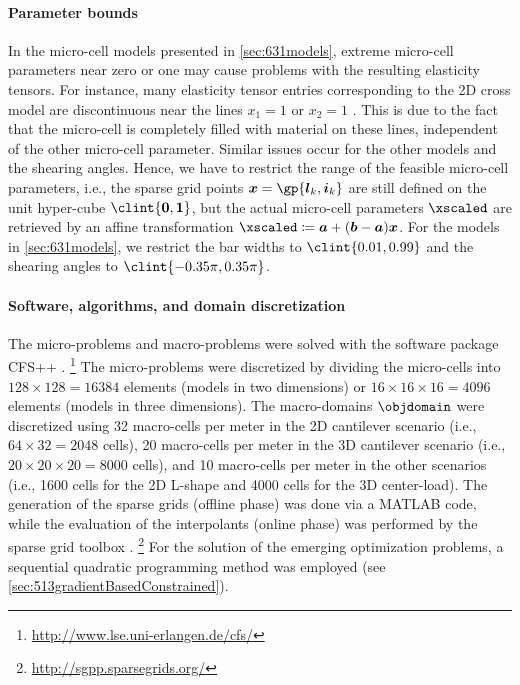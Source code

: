 \paragraph{Parameter bounds}

In the micro-cell models presented in \cref{sec:631models},
extreme micro-cell parameters near zero or one may cause problems
with the resulting elasticity tensors.
For instance, many elasticity tensor entries corresponding to
the 2D cross model are discontinuous near the lines $x_1 = 1$ or $x_2 = 1$
.
This is due to the fact that the micro-cell is completely filled with material
on these lines,
independent of the other micro-cell parameter.
Similar issues occur for the other models and the shearing angles.
Hence, we have to restrict the range of the feasible micro-cell parameters,
i.e., the sparse grid points
$\*x = \gp{\*l_k,\*i_k}$ are still defined on the unit hyper-cube
$\clint{\*0, \*1}$,
but the actual micro-cell parameters $\xscaled$ are retrieved by an
affine transformation $\xscaled \ceq \*a + (\*b - \*a) \*x$.
For the models in \cref{sec:631models},
we restrict the bar widths to $\clint{0.01, 0.99}$ and
the shearing angles to $\clint{-0.35\pi, 0.35\pi}$.

\paragraph{Software, algorithms, and domain discretization}

The micro-problems and macro-problems were solved with the
\fem software package CFS++ \cite{Kaltenbacher10Advanced}.%
\footnote{%
  \url{http://www.lse.uni-erlangen.de/cfs/}%
}
The micro-prob\-lems were discretized by dividing the micro-cells into
$128 \times 128 = \num{16384}$ elements (models in two dimensions) or
$16 \times 16 \times 16 = \num{4096}$ elements (models in three dimensions).
The macro-domains $\objdomain$ were discretized using
32 macro-cells per meter in the 2D cantilever scenario
(i.e., $64 \times 32 = \num{2048}$ cells),
20 macro-cells per meter in the 3D cantilever scenario
(i.e., $20 \times 20 \times 20 = \num{8000}$ cells), and
10 macro-cells per meter in the other scenarios
(i.e.,
\num{1600} cells for the 2D L-shape and
\num{4000} cells for the 3D center-load).
The generation of the sparse grids (offline phase) was done via a MATLAB code,
while the evaluation of the interpolants (online phase) was performed
by the sparse grid toolbox \sgpp \cite{Pflueger10Spatially}.%
\footnote{%
  \url{http://sgpp.sparsegrids.org/}%
}
For the solution of the emerging optimization problems,
a sequential quadratic programming method was employed
(see \cref{sec:513gradientBasedConstrained}).



